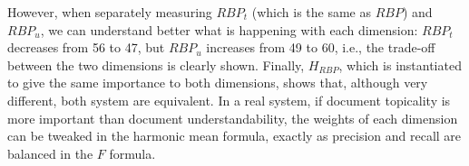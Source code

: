 However, when separately measuring $RBP_t$ (which is the same as $RBP$) and $RBP_u$, we can understand better what is happening with each dimension: $RBP_t$ decreases from 56 to 47, but $RBP_u$ increases from 49 to 60, i.e., the trade-off between the two dimensions is clearly shown.
Finally, $H_{RBP}$, which is instantiated to give the same importance to both dimensions, shows that, although very different, both system are equivalent. 
In a real system, if document topicality is more important than document understandability, the weights of each dimension can be tweaked in the harmonic mean formula, exactly as precision and recall are balanced in the $F$ formula.


 


